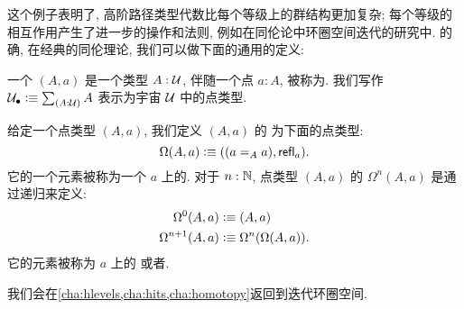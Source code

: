 这个例子表明了, 高阶路径类型代数比每个等级上的群结构更加复杂; 每个等级的相互作用产生了进一步的操作和法则, 例如在同伦论中环圈空间迭代的研究中. 的确, 在经典的同伦理论, 我们可以做下面的通用的定义: 

\begin{defn} \label{def:pointedtype}
一个
%
%
$(A,a)$ 是一个类型 $A:\type$, 伴随一个点 $a:A$, 被称为.
%
我们写作 $\pointed{\type} \defeq \sm{A:\type} A$ 表示为宇宙 $\type$ 中的点类型.
\end{defn}

\begin{defn} \label{def:loopspace}
给定一个点类型 $(A,a)$, 我们定义 $(A,a)$ 的
%
为下面的点类型:
\[\Omega(A,a)\defeq ((\id[A]aa),\refl a).\]
它的一个元素被称为一个 $a$ 上的.
对于 $n:\N$, 点类型 $(A,a)$ 的  $\Omega^{n}(A,a)$
%
%
是通过递归来定义:
\begin{align*}
\Omega^0(A,a)&\defeq(A,a)\\
\Omega^{n+1}(A,a)&\defeq\Omega^n(\Omega(A,a)).
\end{align*}
它的元素被称为 $a$ 上的
%
%
或者.
%
%

\end{defn}

我们会在\cref{cha:hlevels,cha:hits,cha:homotopy}返回到迭代环圈空间. %
%